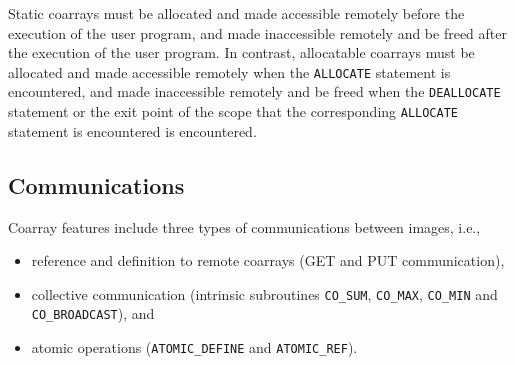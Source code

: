 %     

\requirement
Static coarrays must be allocated and made accessible remotely
before the execution of the user program, and 
made inaccessible remotely and be freed after the execution of the user program.
In contrast, 
allocatable coarrays must be allocated and made accessible remotely
when the {\tt ALLOCATE} statement is encountered, and 
made inaccessible remotely and be freed when the {\tt DEALLOCATE} statement or 
the exit point of the scope that the corresponding {\tt ALLOCATE} statement is encountered 
is encountered.


\subsection{Communications}

Coarray features include three types of communications between images, i.e.,
\begin{itemize}
\item reference and definition to remote coarrays (GET and PUT communication),
\item collective communication (intrinsic subroutines {\tt CO\_SUM}, {\tt CO\_MAX}, 
{\tt CO\_MIN} and {\tt CO\_BROADCAST}), and
\item atomic operations ({\tt ATOMIC\_DEFINE} and {\tt ATOMIC\_REF}).
\end{itemize}

